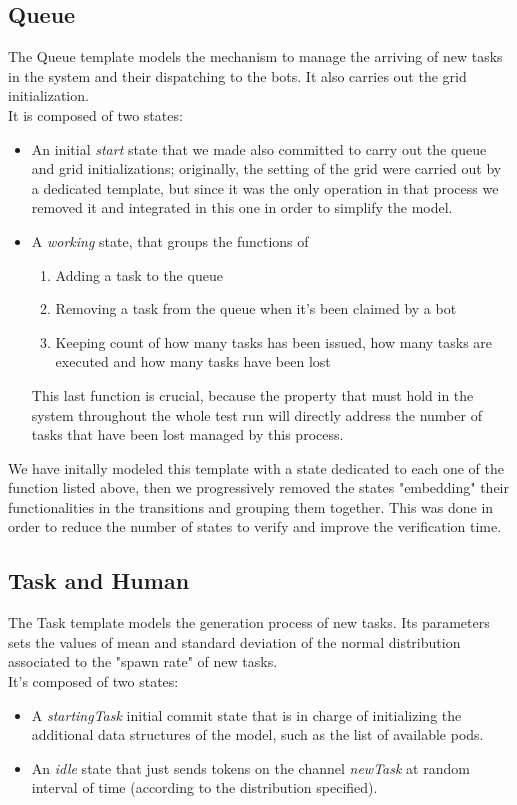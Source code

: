 \documentclass[10pt,a4paper]{article}
\begin{document}
		\subsection{Queue}
			The Queue template models the mechanism to manage the arriving of new tasks in the system and their dispatching to the bots. It also carries out the grid initialization.\\
			It is composed of two states:
			\begin{itemize}
				\item An initial \emph{start} state that we made also committed to carry out the queue and grid initializations; originally, the setting of the grid were carried out by a dedicated template, but since it was the only operation in that process we removed it and integrated in this one in order to simplify the model.
				\item A \emph{working} state, that groups the functions of
					\begin{enumerate}
						\item Adding a task to the queue
						\item Removing a task from the queue when it's been claimed by a bot
						\item Keeping count of how many tasks has been issued, how many tasks are executed and how many tasks have been lost
					\end{enumerate}
					This last function is crucial, because the property that must hold in the system throughout the whole test run will directly address the number of tasks that have been lost managed by this process.
			\end{itemize}
			We have initally modeled this template with a state dedicated to each one of the function listed above, then we progressively removed the states "embedding" their functionalities in the transitions and grouping them together. This was done in order to reduce the number of states to verify and improve the verification time. 
		
		\subsection{Task and Human}
			The Task template models the generation process of new tasks. Its parameters sets the values of mean and standard deviation of the normal distribution associated to the "spawn rate" of new tasks.\\
			It's composed of two states:
			\begin{itemize}
				\item A \emph{startingTask} initial commit state that is in charge of initializing the additional data structures of the model, such as the list of available pods.
				\item An \emph{idle} state that just sends tokens on the channel \emph{newTask} at random interval of time (according to the distribution specified).
			\end{itemize}
	
\end{document}
